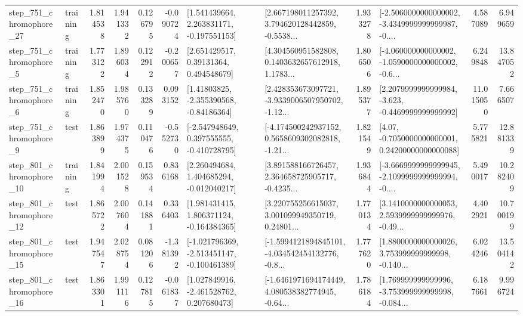 \begin{tabular}{llrrrrllrlrr}
  step\_751\_chromophore\_27 &  training &      1.814538 &    1.941332 &      0.126795 & -0.090724 &    [1.541439664, 2.263831171, -0.197551153] &  [2.667198011257392, 3.794620128442859, -0.5538... &       1.933278 &  [-2.5060000000000002, -3.4349999999999987, -0.... &            4.587089 &          6.949659 \\
   step\_751\_chromophore\_5 &  training &      1.773122 &    1.896034 &      0.122912 & -0.200657 &      [2.651429517, 0.39131364, 0.494548679] &  [4.304560951582808, 0.1403632657612918, 1.1783... &       1.806506 &  [-4.060000000000002, -1.0590000000000002, -0.6... &            6.249848 &         13.847052 \\
   step\_751\_chromophore\_6 &  training &      1.852470 &    1.985760 &      0.133289 &  0.093152 &     [1.41803825, -2.355390568, -0.84186364] &  [2.428353673097721, -3.9339006507950702, -1.12... &       1.895377 &  [2.2079999999999984, -3.623, -0.4469999999999992] &           11.015050 &          7.666507 \\
   step\_751\_chromophore\_9 &      test &      1.863899 &    1.974375 &      0.110476 & -0.552730 &   [-2.547948649, 0.397555555, -0.410728795] &  [-4.174500242937152, 0.5658609302082818, -1.21... &       1.821549 &   [4.07, -0.7050000000000001, 0.24200000000000088] &            5.775821 &         12.881339 \\
  step\_801\_chromophore\_10 &  training &      1.841994 &    2.001528 &      0.159534 &  0.836168 &    [2.260494684, 1.404685294, -0.012040217] &  [3.891588166726457, 2.364658725905717, -0.4235... &       1.936844 &  [-3.6669999999999945, -2.1099999999999994, -0.... &            5.490017 &         10.282409 \\
  step\_801\_chromophore\_12 &      test &      1.865722 &    2.007604 &      0.141881 &  0.336403 &    [1.981431415, 1.806371124, -0.164384365] &  [3.220755256615037, 3.001099949350719, 0.24801... &       1.770134 &  [3.1410000000000053, 2.5939999999999976, -0.49... &            4.402921 &         10.700199 \\
  step\_801\_chromophore\_15 &      test &      1.947547 &    2.028754 &      0.081206 & -1.381392 &  [-1.021796369, -2.513451147, -0.100461389] &  [-1.5994121894845101, -4.034542454132776, -0.8... &       1.777620 &  [1.8800000000000026, 3.753999999999998, -0.140... &            6.024246 &         13.504142 \\
  step\_801\_chromophore\_16 &      test &      1.863301 &    1.991116 &      0.127815 & -0.061837 &    [1.027849916, -2.461528762, 0.207680473] &  [-1.6461971694174449, 4.080538382774945, -0.64... &       1.786184 &  [1.769999999999996, -3.753999999999998, -0.084... &            6.187661 &          9.996724 \\

\end{tabular}
